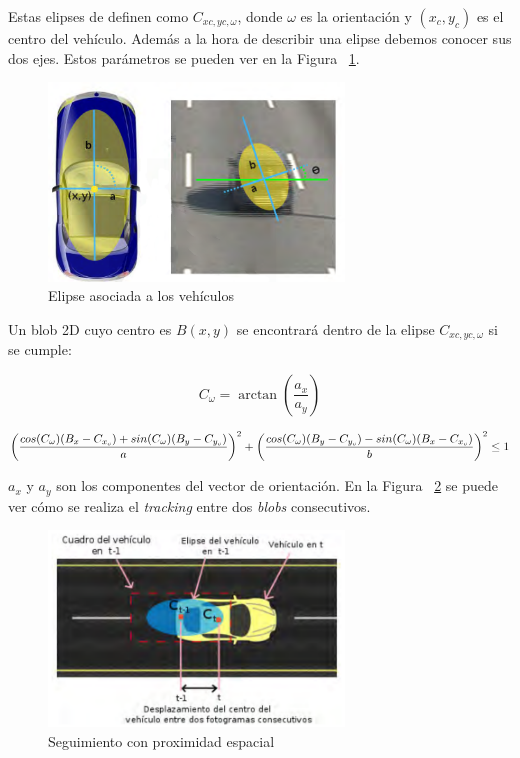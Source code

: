 Estas elipses de definen como $C_{xc,yc,\omega}$, donde $\omega$ es la orientación y $(x_c, y_c)$ es el centro del vehículo. Además a la hora de describir una elipse debemos conocer sus dos ejes. Estos parámetros se pueden ver en la Figura ~\ref{fig.elipse}.

 \begin{figure}[H] 
\begin{center}
    \includegraphics[width=0.7\textwidth]{figures/Diseno_global/elipse.png}
   \caption{Elipse asociada a los vehículos}
	\label{fig.elipse}
\end{center}
\end{figure}

Un blob 2D cuyo centro es $B(x,y)$ se encontrará dentro de la elipse  $C_{xc,yc,\omega}$ si se cumple:

\begin{equation}\label{ec.blob_elipse}
   C_{\omega} = \arctan(\frac{a_x}{a_y})
\end{equation}

\begin{equation} \scriptsize \label{ec.blob_elipse1}
   \left(\frac{cos(C_\omega)(B_x - C_{x_c}) + sin(C_\omega)(B_y - C_{y_c})}{a} \right)^2 + \left(\frac{cos(C_\omega)(B_y - C_{y_c}) - sin(C_\omega)(B_x - C_{x_c})}{b} \right)^2 \leq 1
\end{equation}

$a_x$ y $a_y$ son los componentes del vector de orientación. En la Figura ~\ref{fig.emparejamiento_blob} se puede ver cómo se realiza el \textit{tracking} entre dos \textit{blobs} consecutivos. 

 \begin{figure}[H] 
\begin{center}
   \includegraphics[width=0.7\textwidth]{figures/Diseno_global/emparejamiento_blob.png}
   \caption{Seguimiento con proximidad espacial}
	\label{fig.emparejamiento_blob}
\end{center}
\end{figure}



